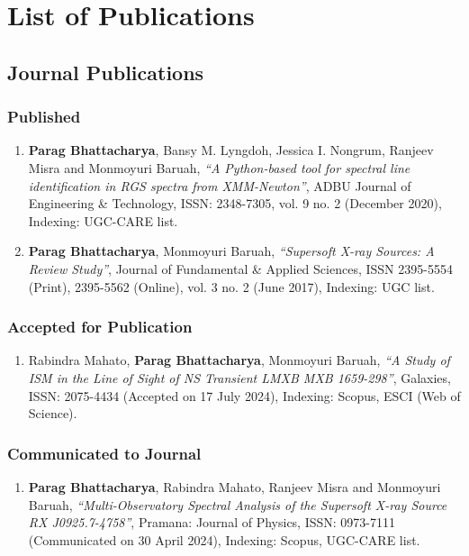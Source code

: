 \chapter{List of Publications} \label{appendix:publications}

    \section{Journal Publications}
    	\subsection{Published}
    		\begin{enumerate}
    			\item \textbf{Parag Bhattacharya}, Bansy M. Lyngdoh, Jessica I. Nongrum, Ranjeev Misra and Monmoyuri Baruah, \textit{``A Python-based tool for spectral line identification in RGS spectra from XMM-Newton''}, ADBU Journal of Engineering \& Technology, ISSN: 2348-7305, vol. 9 no. 2 (December 2020), Indexing: UGC-CARE list.

    			\item \textbf{Parag Bhattacharya}, Monmoyuri Baruah, \textit{``Supersoft X-ray Sources: A Review Study''}, Journal of Fundamental \& Applied Sciences, ISSN 2395-5554 (Print), 2395-5562 (Online), vol. 3 no. 2 (June 2017), Indexing: UGC list.
    		\end{enumerate}
    	
    	\subsection{Accepted for Publication}
    		\begin{enumerate}
    			\item Rabindra Mahato, \textbf{Parag Bhattacharya}, Monmoyuri Baruah, \textit{``A Study of ISM in the Line of Sight of NS Transient LMXB MXB 1659-298''}, Galaxies, ISSN: 2075-4434 (Accepted on 17 July 2024), Indexing: Scopus, ESCI (Web of Science).
    		\end{enumerate}
    		
    	\subsection{Communicated to Journal}
    		\begin{enumerate}
    			\item \textbf{Parag Bhattacharya}, Rabindra Mahato, Ranjeev Misra and Monmoyuri Baruah, \textit{``Multi-Observatory Spectral Analysis of the Supersoft X-ray Source RX J0925.7-4758''}, Pramana: Journal of Physics, ISSN: 0973-7111 (Communicated on 30 April 2024), Indexing: Scopus, UGC-CARE list.
    		\end{enumerate}
    
